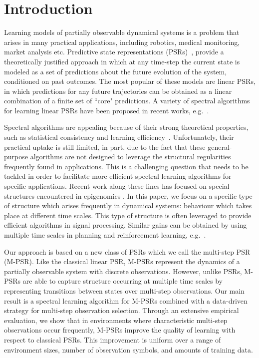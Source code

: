 \section{Introduction}

Learning models of partially observable dynamical systems is a problem that arises in many practical applications, including robotics, medical monitoring, market analysis etc.  Predictive state representations (PSRs)~\cite{littmanpsr,singh04,rosencrantz04}, provide a theoretically justified approach in which at any time-step the current state is modeled as a set of predictions about the future evolution of the system, conditioned on past outcomes.  The most popular of these models are linear PSRs, in which predictions for any future trajectories can be obtained as a linear combination of a finite set of ``core" predictions. A variety of spectral algorithms for learning linear PSRs have been proposed in recent works, e.g.~\cite{bootspsr,Hamilton2013}.

Spectral algorithms are appealing because of their strong theoretical properties, such as statistical consistency and learning efficiency~\cite{hsu09,bailly10}. Unfortunately, their practical uptake is still limited, in part, due to the fact that these general-purpose algorithms are not designed to leverage the structural regularities frequently found in applications. This is a challenging question that needs to be tackled in order to facilitate more efficient spectral learning algorithms for specific applications. Recent work along these lines has focused on special structures encountered in epigenomics \cite{zhang2015spectral}. In this paper, we focus on a specific type of structure which arises frequently in dynamical systems: behaviour which takes place at different time scales. This type of structure is often leveraged to provide efficient algorithms in signal processing. Similar gains can be obtained by using multiple time scales in planning and reinforcement learning, e.g.~\cite{sutton99}.

Our approach is based on a new class of PSRs which we call the multi-step PSR (M-PSR). Like the classical linear PSR, M-PSRs represent the dynamics of a partially observable system with discrete observations. However, unlike PSRs, M-PSRs are able to capture structure occurring at multiple time scales by representing transitions between states over multi-step observations. Our main result is a spectral learning algorithm for M-PSRs combined with a data-driven strategy for multi-step observation selection. Through an extensive empirical evaluation, we show that in environments where characteristic multi-step observations occur frequently, M-PSRs improve the quality of learning with respect to classical PSRs. This improvement is uniform over a range of environment sizes, number of observation symbols, and amounts of training data. 
